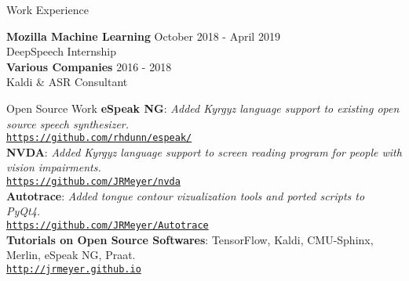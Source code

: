 \documentclass{resume} %
\begin{document}

\vspace{.25cm}

\begin{rSection}{Work Experience}
  
{\bf Mozilla Machine Learning} \hfill {October 2018 - April 2019} \\ 
DeepSpeech Internship  \hfill {} \\
  
{\bf Various Companies} \hfill {2016 - 2018} \\ 
Kaldi \& ASR Consultant  \hfill {} \\

\end{rSection}



\vspace{.25cm}

\begin{rSection}{Open Source Work}
{\textbf{eSpeak NG}:} {\textit{Added Kyrgyz language support to existing open source speech synthesizer.}} \\
 {\href{https://github.com/rhdunn/espeak/commits?author=JRMeyer}{\texttt{https://github.com/rhdunn/espeak/}}}{} \\

{\textbf{NVDA}:} {\textit{Added Kyrgyz language support to screen reading program for people with vision impairments.}} \\
 {\href{https://github.com/JRMeyer/nvda}{\texttt{https://github.com/JRMeyer/nvda}}}{} \\

{\textbf{Autotrace}:} {\textit{Added tongue contour vizualization tools and ported scripts to PyQt4.}} \\
 {\href{https://github.com/JRMeyer/Autotrace}{\texttt{https://github.com/JRMeyer/Autotrace}}}{} \\

{\textbf{Tutorials on Open Source Softwares}:} {TensorFlow, Kaldi, CMU-Sphinx, Merlin, eSpeak NG, Praat.}\\
 {\href{http://jrmeyer.github.io/}{\texttt{http://jrmeyer.github.io}}}{} \\
\end{rSection}
\end{document}
